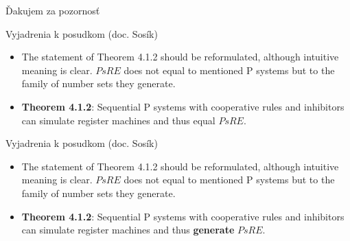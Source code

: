 

\begin{frame}[plain]
\begin{center}
  Ďakujem za pozornosť
\end{center}
\end{frame}

\begin{frame}[t]{Vyjadrenia k posudkom (doc. Sosík)}
  \begin{itemize}
    \item The statement of Theorem 4.1.2 should be reformulated, although intuitive meaning is clear. $PsRE$ does not equal to mentioned P systems but to the family of number sets they generate.
    \item {\bf Theorem 4.1.2}: Sequential P systems with cooperative rules and inhibitors can simulate register machines and thus equal $PsRE$.
  \end{itemize}
\end{frame}

\begin{frame}[t]{Vyjadrenia k posudkom (doc. Sosík)}
  \begin{itemize}
    \item The statement of Theorem 4.1.2 should be reformulated, although intuitive meaning is clear. $PsRE$ does not equal to mentioned P systems but to the family of number sets they generate.
    \item {\bf Theorem 4.1.2}: Sequential P systems with cooperative rules and inhibitors can simulate register machines and thus {\bf generate} $PsRE$.
  \end{itemize}
\end{frame}


